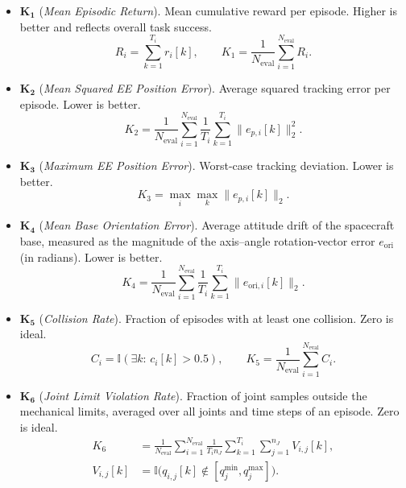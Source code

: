 \documentclass{ieeeaccess}
\begin{document}
\begin{itemize}
  \item $\boldsymbol{K_1}$ (\emph{Mean Episodic Return}). Mean cumulative reward per episode. Higher is better and
  reflects overall task success.
  \begin{equation*}
  R_i=\sum_{k=1}^{T_i} r_i[k], \qquad K_1=\frac{1}{N_{\mathrm{eval}}}\sum_{i=1}^{N_{\mathrm{eval}}} R_i.
  \end{equation*}

  \item $\boldsymbol{K_2}$ (\emph{Mean Squared EE Position Error}). Average squared tracking error per episode. Lower
  is better.
  \begin{equation*}
  K_2=\frac{1}{N_{\mathrm{eval}}}\sum_{i=1}^{N_{\mathrm{eval}}}\frac{1}{T_i}\sum_{k=1}^{T_i}\|e_{p,i}[k]\|_2^2.
  \end{equation*}

  \item $\boldsymbol{K_3}$ (\emph{Maximum EE Position Error}). Worst-case tracking deviation. Lower is better.
  \begin{equation*}
  K_3=\max_{i}\max_{k}\|e_{p,i}[k]\|_2.
  \end{equation*}

  \item $\boldsymbol{K_4}$ (\emph{Mean Base Orientation Error}). Average attitude drift of the spacecraft base, measured
  as the magnitude of the axis--angle rotation-vector error $e_{\mathrm{ori}}$ (in radians). Lower is better.
  \begin{equation*}
  K_4=\frac{1}{N_{\mathrm{eval}}}\sum_{i=1}^{N_{\mathrm{eval}}}\frac{1}{T_i}\sum_{k=1}^{T_i}\|e_{\mathrm{ori},i}[k]\|_2.
  \end{equation*}

  \item $\boldsymbol{K_5}$ (\emph{Collision Rate}). Fraction of episodes with at least one collision. Zero is
  ideal.
  \begin{equation*}
  C_i=\mathbb{I}(\exists k:\,c_i[k]>0.5), \qquad K_5=\frac{1}{N_{\mathrm{eval}}}\sum_{i=1}^{N_{\mathrm{eval}}} C_i.
  \end{equation*}

  \item $\boldsymbol{K_6}$ (\emph{Joint Limit Violation Rate}). Fraction of joint samples
  outside the mechanical limits, averaged over all joints and time steps of an episode. Zero is ideal.
  \begin{equation*}
  \begin{aligned}
  K_6 &= \frac{1}{N_{\mathrm{eval}}}\sum_{i=1}^{N_{\mathrm{eval}}}\frac{1}{T_i n_J}\sum_{k=1}^{T_i}\sum_{j=1}^{n_J}
  V_{i,j}[k],\\
  V_{i,j}[k] &= \mathbb{I}\!\big(q_{i,j}[k]\notin[q_j^{\min},q_j^{\max}]\big).
  \end{aligned}
  \end{equation*}


\end{itemize}
\end{document}
